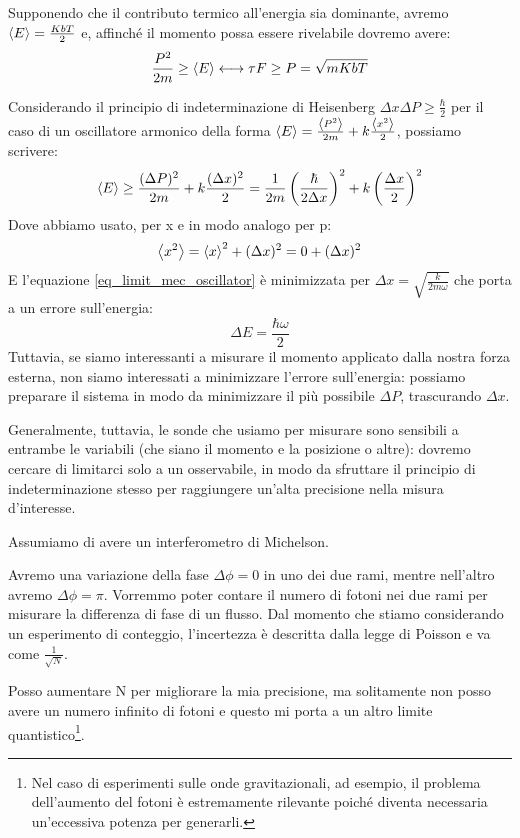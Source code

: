 \noindent Supponendo che il contributo termico all'energia sia dominante, avremo $\expval E = \frac{KbT}{2}$ e, affinché il momento possa essere rivelabile dovremo avere:
\begin{equation*}
    \frac{P^2}{2m}\ge \expval E \longleftrightarrow \tau F \ge P= \sqrt{mKbT}
\end{equation*}

\noindent Considerando il principio di indeterminazione di Heisenberg $\Delta x \Delta P \ge \frac{\hbar}{2}$ per il caso di un oscillatore armonico della forma $\expval E = \frac{\expval{P^2}}{2m}+k\frac{\expval{x^2}}{2}$, possiamo scrivere:
\begin{equation}\label{eq_limit_mec_oscillator}
    \expval E \ge \frac{(\Delta P)^2}{2m}+ k \frac{(\Delta x)^2}{2}= \frac{1}{2m}\left( \frac{\hbar }{2\Delta x}\right) ^2 + k \left( \frac{\Delta x}{2}\right)^2
\end{equation}
Dove abbiamo usato, per x e in modo analogo per p:
\begin{equation*}
    \expval{x^2} = \expval x ^2 + (\Delta x)^2 = 0 + (\Delta x)^2
\end{equation*}
E l'equazione \ref{eq_limit_mec_oscillator} è minimizzata per $\Delta x = \sqrt{\frac{k}{2m\omega}}$ che porta a un errore sull'energia: 
\begin{equation*}
    \Delta E = \frac{\hbar \omega}{2}
\end{equation*}
Tuttavia, se siamo interessanti a misurare il momento applicato dalla nostra forza esterna, non siamo interessati a minimizzare l'errore sull'energia: possiamo preparare il sistema in modo da minimizzare il più possibile $\Delta P$, trascurando $\Delta x$. 

\noindent Generalmente, tuttavia, le sonde che usiamo per misurare sono sensibili a entrambe le variabili (che siano il momento e la posizione o altre): dovremo cercare di limitarci solo a un osservabile, in modo da sfruttare il principio di indeterminazione stesso per raggiungere un'alta precisione nella misura d'interesse.

\begin{esempio}
    Assumiamo di avere un interferometro di Michelson.
    
    \noindent Avremo una variazione della fase $\Delta \phi = 0$ in uno dei due rami, mentre nell'altro avremo $\Delta \phi = \pi$. Vorremmo poter contare il numero di fotoni nei due rami per misurare la differenza di fase di un flusso. Dal momento che stiamo considerando un esperimento di conteggio, l'incertezza è descritta dalla legge di Poisson e va come $\frac{1}{\sqrt N}$.
    
    \noindent Posso aumentare N per migliorare la mia precisione, ma solitamente non posso avere un numero infinito di fotoni e questo mi porta a un altro limite quantistico\footnote{Nel caso di esperimenti sulle onde gravitazionali, ad esempio, il problema dell'aumento del fotoni è estremamente rilevante poiché diventa necessaria un'eccessiva potenza per generarli.}.
\end{esempio}

